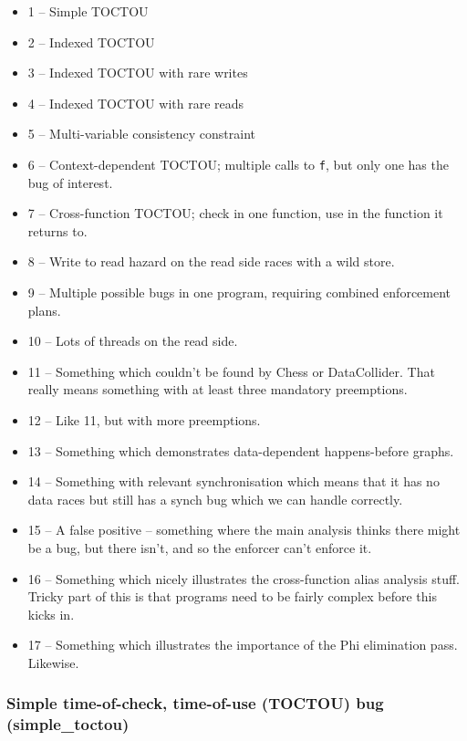 \begin{itemize}
\item 1 -- Simple TOCTOU
\item 2 -- Indexed TOCTOU
\item 3 -- Indexed TOCTOU with rare writes
\item 4 -- Indexed TOCTOU with rare reads
\item 5 -- Multi-variable consistency constraint
\item 6 -- Context-dependent TOCTOU; multiple calls to \verb|f|, but
  only one has the bug of interest.
\item 7 -- Cross-function TOCTOU; check in one function, use in the
  function it returns to.
\item 8 -- Write to read hazard on the read side races with a wild
  store.
\item 9 -- Multiple possible bugs in one program, requiring combined
  enforcement plans.
\item 10 -- Lots of threads on the read side.
\item 11 -- Something which couldn't be found by Chess or
  DataCollider.  That really means something with at least three
  mandatory preemptions.
\item 12 -- Like 11, but with more preemptions.
\item 13 -- Something which demonstrates data-dependent happens-before
  graphs.
\item 14 -- Something with relevant synchronisation which means that
  it has no data races but still has a synch bug which we can handle
  correctly.
\item 15 -- A false positive -- something where the main analysis
  thinks there might be a bug, but there isn't, and so the enforcer
  can't enforce it.
\item 16 -- Something which nicely illustrates the cross-function
  alias analysis stuff.  Tricky part of this is that programs need to
  be fairly complex before this kicks in.
\item 17 -- Something which illustrates the importance of the Phi
  elimination pass.  Likewise.
\end{itemize}

\subsubsection{Simple time-of-check, time-of-use (TOCTOU) bug (simple\_toctou)}
\label{sect:eval:art:simple_toctou}

